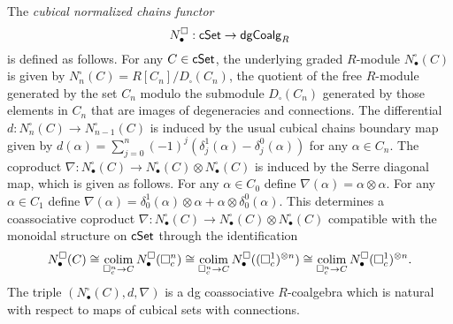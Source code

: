 The \textit{cubical normalized chains functor} $$N^{\square}_\bullet: \mathsf{cSet} \to \mathsf{dgCoalg}_R$$ is defined as follows. For any $C \in \mathsf{cSet}$, the underlying graded $R$-module $N^{\square}_\bullet(C)$ is given by $N^{\square}_n(C)= R[C_n] / D_{\square}(C_n)$, the quotient of the free $R$-module generated by the set $C_n$ modulo the submodule $D_{\square}(C_n)$ generated by those elements in $C_n$ that are images of degeneracies and connections. The differential $d: N^{\square}_n(C) \to N^{\square}_{n-1}(C)$ is induced by the usual cubical chains boundary map given by $d(\alpha)= \sum_{j=0}^n (-1)^j (\delta^1_j(\alpha)- \delta^0_j(\alpha))$ for any $\alpha \in C _n.$ The coproduct $\nabla: N^{\square}_\bullet(C) \to N^{\square}_\bullet(C) \otimes N^{\square}_\bullet(C)$ is induced by the Serre diagonal map, which is given as follows. For any $\alpha \in C_0$ define $\nabla(\alpha)= \alpha \otimes \alpha.$ For any $\alpha \in C_1$ define $\nabla(\alpha)= \delta^1_0(\alpha)\otimes \alpha + \alpha \otimes \delta^0_0(\alpha)$.
This determines a coassociative coproduct $\nabla: N^{\square}_\bullet(C) \to N^{\square}_\bullet(C) \otimes N^{\square}_\bullet(C)$ compatible with the monoidal structure on $\mathsf{cSet}$ through the identification $$N^{\square}_\bullet(C) \cong \operatorname*{colim}_{\square^n_c \to C} N^{\square}_\bullet (\square^n_c) \cong  \operatorname*{colim}_{\square^n_c \to C} N^{\square}_\bullet ((\square^1_c)^{\otimes n})\cong  \operatorname*{colim}_{\square^n_c \to C}  N^{\square}_\bullet(\square^1_c)^{\otimes n}.$$ The triple $(N^{\square}_\bullet(C), d, \nabla)$ is a dg coassociative $R$-coalgebra which is natural with respect to maps of cubical sets with connections. 


